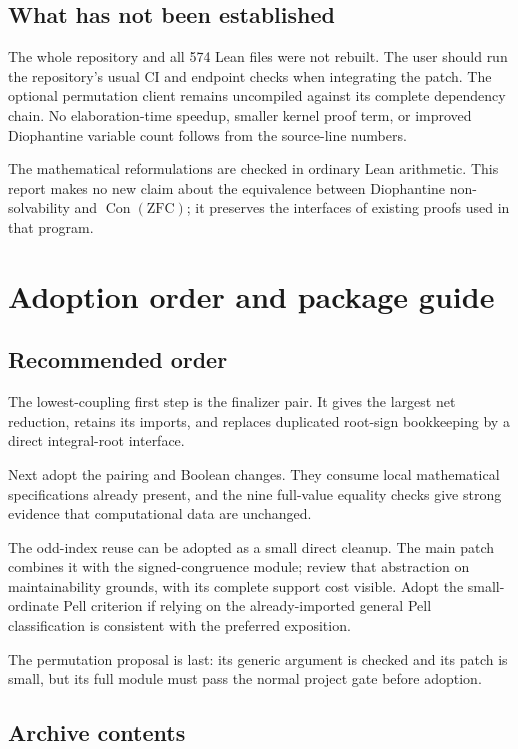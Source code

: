 \documentclass[11pt,letterpaper]{article}
\begin{document}
\subsection{What has not been established}

The whole repository and all 574 Lean files were not rebuilt. The user should
run the repository's usual CI and endpoint checks when integrating the patch.
The optional permutation client remains uncompiled against its complete
dependency chain. No elaboration-time speedup, smaller kernel proof term,
or improved Diophantine variable count follows from the source-line numbers.

The mathematical reformulations are checked in ordinary Lean arithmetic.
This report makes no new claim about the equivalence between Diophantine
non-solvability and \(\operatorname{Con}(\mathrm{ZFC})\); it preserves the
interfaces of existing proofs used in that program.

\section{Adoption order and package guide}

\subsection{Recommended order}

The lowest-coupling first step is the finalizer pair. It gives the largest
net reduction, retains its imports, and replaces duplicated root-sign
bookkeeping by a direct integral-root interface.

Next adopt the pairing and Boolean changes. They consume local mathematical
specifications already present, and the nine full-value equality checks give
strong evidence that computational data are unchanged.

The odd-index reuse can be adopted as a small direct cleanup. The main patch
combines it with the signed-congruence module; review that abstraction on
maintainability grounds, with its complete support cost visible. Adopt the
small-ordinate Pell criterion if relying on the already-imported general
Pell classification is consistent with the preferred exposition.

The permutation proposal is last: its generic argument is checked and its
patch is small, but its full module must pass the normal project gate before
adoption.

\subsection{Archive contents}
\end{document}
